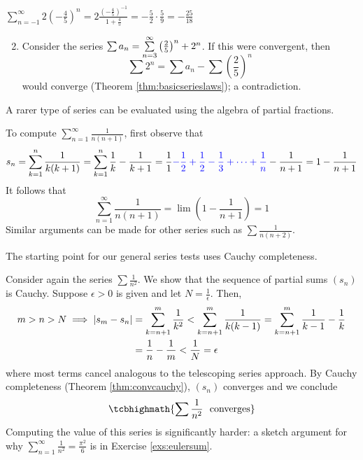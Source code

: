 \begin{examples}{}{}
	\exstart $\displaystyle \sum_{n=-1}^\infty 2\left(-\frac 45\right)^n
		=2\frac{\left(-\frac 45\right)^{-1}}{1+\frac 45} 
		=-\frac 52\cdot\frac 59
		=-\frac{25}{18}$
	\begin{enumerate}\setcounter{enumi}{1}
	  \item Consider the series $\sum a_n=\smash[b]{\sum\limits_{n=3}^\infty} \left(\frac 25\right)^n +2^n$. If this were convergent, then
		\[
			\sum 2^n=\sum a_n-\sum\left(\frac 25\right)^n
		\]
		would converge (Theorem \ref{thm:basicserieslaws}); a contradiction.
	\end{enumerate}
\end{examples}



A rarer type of series can be evaluated using the algebra of partial fractions.

\begin{example}{}{}
	To compute $\sum\limits_{n=1}^\infty\frac 1{n(n+1)}$, first  observe that
	\[
		s_n=\sum_{k=1}^n\frac 1{k(k+1)} 
		=\sum_{k=1}^n\frac 1k-\frac 1{k+1} 
		=\frac 11\textcolor{blue}{-\frac 12+\frac 12-\frac 13+\cdots+\frac 1n}-\frac 1{n+1}
		=1-\frac 1{n+1}
	\]
	It follows that
	\[
		\sum_{n=1}^\infty\frac 1{n(n+1)}
		=\lim \left(1-\frac 1{n+1}\right)=1
	\]
	Similar arguments can be made for other series such as $\sum\frac 1{n(n+2)}$.
\end{example}


\goodbreak



The starting point for our general series tests uses Cauchy completeness.

\begin{example}{}{}
	Consider again the series $\sum\frac 1{n^2}$. We show that the sequence of partial sums $(s_n)$ is Cauchy. Suppose $\epsilon>0$ is given and let $N=\frac 1\epsilon$. Then,
	\begin{align*}
		m>n>N\implies \left| s_m-s_n\right|
		&=\sum_{k=n+1}^m\frac 1{k^2}<\sum_{k=n+1}^m\frac 1{k(k-1)} 
		=\sum_{k=n+1}^m\frac 1{k-1}-\frac 1k\\
		&=\frac 1n-\frac 1m<\frac 1N =\epsilon
	\end{align*}
	where most terms cancel analogous to the telescoping series approach. By Cauchy completeness (Theorem \ref{thm:convcauchy}), $(s_n)$ converges and we conclude
	\[
		\tcbhighmath{\sum\frac 1{n^2}\ \text{ converges}}
	\]
	Computing the value of this series is significantly harder: a sketch argument for why $\sum_{n=1}^\infty\frac 1{n^2}=\frac{\pi^2}6$ is in Exercise \ref{exs:eulersum}.
\end{example}

